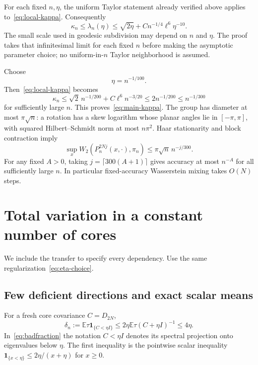 \documentclass[11pt]{article}
\theoremstyle{definition}\newtheorem{definition}[theorem]{Definition}
\theoremstyle{remark}\newtheorem{remark}[theorem]{Remark}
\newcommand{\E}{\mathbb E}
\newcommand{\one}{\mathbf1}
\begin{document}
For each fixed $n,\eta$, the uniform Taylor statement already verified above applies to~\eqref{eq:local-kappa}. Consequently
\begin{equation}\label{eq:global-kappa-expanded}
 \kappa_n\le\lambda_n(\eta)
 \le\sqrt{2\eta}+Cn^{-1/4}\ell^6\eta^{-10}.
\end{equation}
The small scale used in geodesic subdivision may depend on $n$ and $\eta$. The proof takes that infinitesimal limit for each fixed $n$ before making the asymptotic parameter choice; no uniform-in-$n$ Taylor neighborhood is assumed.


Choose
\begin{equation}\label{eq:eta-choice}
 \eta=n^{-1/100}.
\end{equation}
Then~\eqref{eq:local-kappa} becomes
\[
 \kappa_n\le\sqrt2\,n^{-1/200}+C\ell^6 n^{-3/20}
 \le2n^{-1/200}\le n^{-1/300}
\]
for sufficiently large $n$. This proves~\eqref{eq:main-kappa}.
The group has diameter at most $\pi\sqrt n$: a rotation has a skew logarithm whose planar angles lie in $[-\pi,\pi]$, with squared Hilbert--Schmidt norm at most $n\pi^2$. Haar stationarity and block contraction imply
\begin{equation}\label{eq:Witerate}
 \sup_xW_2(P_n^{2Nj}(x,\cdot),\pi_n)
 \le\pi\sqrt n\,n^{-j/300}.
\end{equation}
For any fixed $A>0$, taking $j=\lceil300(A+1)\rceil$ gives accuracy at most $n^{-A}$ for all sufficiently large $n$. In particular fixed-accuracy Wasserstein mixing takes $O(N)$ steps.

\section{Total variation in a constant number of cores}\label{sec:tv}
We include the transfer to specify every dependency. Use the same regularization~\eqref{eq:eta-choice}.

\subsection{Few deficient directions and exact scalar means}
For a fresh core covariance $C=D_{2N}$,
\begin{equation}\label{eq:badfraction}
 \delta_n:=\E\tau\one_{\{C<\eta I\}}
 \le 2\eta\E\tau(C+\eta I)^{-1}\le4\eta.
\end{equation}
In~\eqref{eq:badfraction} the notation $C<\eta I$ denotes its spectral projection onto eigenvalues below $\eta$. The first inequality is the pointwise scalar inequality
$\one_{\{x<\eta\}}\le2\eta/(x+\eta)$ for $x\ge0$.
\end{document}
